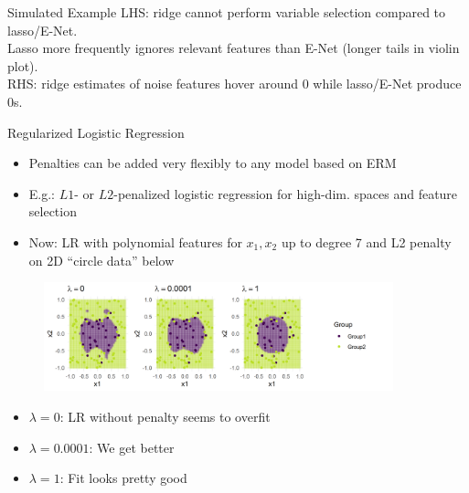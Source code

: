 \documentclass[11pt,compress,t,notes=noshow, xcolor=table]{beamer}
\begin{document}
\begin{vbframe} {Simulated Example}
\footnotesize
LHS: ridge cannot perform variable selection compared to lasso/E-Net. \\
Lasso more frequently ignores relevant features than E-Net (longer tails in violin plot).\\
RHS: ridge estimates of noise features hover around $0$ while lasso/E-Net produce $0$s.

\end{vbframe}



\begin{vbframe}{Regularized Logistic Regression}

\begin{itemize}

\item Penalties can be added very flexibly to any model based on ERM

\item E.g.: $L1$- or $L2$-penalized logistic regression for high-dim. spaces and feature selection



\item Now: LR with polynomial features for $x_1, x_2$ up to degree 7 and L2 penalty on 2D ``circle data'' below

\end{itemize}

\begin{figure}
\includegraphics[width=0.9\textwidth]{figure/reg_logreg.png}\\
\end{figure}

\begin{itemize}
\item $\lambda = 0$: LR without penalty seems to overfit
\item $\lambda = 0.0001$: We get better
\item $\lambda = 1$: Fit looks pretty good
\end{itemize}


\end{vbframe}


\endlecture
\end{document}
